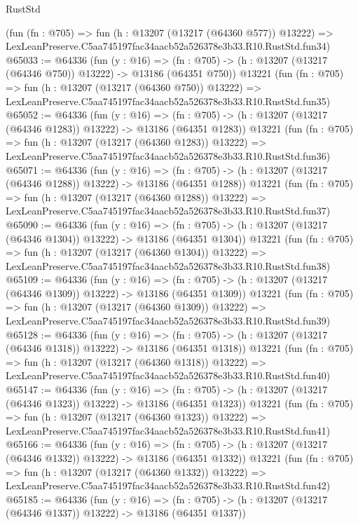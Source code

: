 \begin{lexlean}{RustStd}
\begin{coremodule}
    (fun (fn : @705) =>
    fun (h : @13207 (@13217 (@64360 @577)) @13222) =>
    LexLeanPreserve.C5aa745197fac34aacb52a526378e3b33.R10.RustStd.fun34)
@65033 := @64336
    (fun (y : @16) =>
    (fn : @705) -> (h : @13207 (@13217 (@64346 @750)) @13222) -> @13186 (@64351 @750))
    @13221
    (fun (fn : @705) =>
    fun (h : @13207 (@13217 (@64360 @750)) @13222) =>
    LexLeanPreserve.C5aa745197fac34aacb52a526378e3b33.R10.RustStd.fun35)
@65052 := @64336
    (fun (y : @16) =>
    (fn : @705) -> (h : @13207 (@13217 (@64346 @1283)) @13222) -> @13186 (@64351 @1283))
    @13221
    (fun (fn : @705) =>
    fun (h : @13207 (@13217 (@64360 @1283)) @13222) =>
    LexLeanPreserve.C5aa745197fac34aacb52a526378e3b33.R10.RustStd.fun36)
@65071 := @64336
    (fun (y : @16) =>
    (fn : @705) -> (h : @13207 (@13217 (@64346 @1288)) @13222) -> @13186 (@64351 @1288))
    @13221
    (fun (fn : @705) =>
    fun (h : @13207 (@13217 (@64360 @1288)) @13222) =>
    LexLeanPreserve.C5aa745197fac34aacb52a526378e3b33.R10.RustStd.fun37)
@65090 := @64336
    (fun (y : @16) =>
    (fn : @705) -> (h : @13207 (@13217 (@64346 @1304)) @13222) -> @13186 (@64351 @1304))
    @13221
    (fun (fn : @705) =>
    fun (h : @13207 (@13217 (@64360 @1304)) @13222) =>
    LexLeanPreserve.C5aa745197fac34aacb52a526378e3b33.R10.RustStd.fun38)
@65109 := @64336
    (fun (y : @16) =>
    (fn : @705) -> (h : @13207 (@13217 (@64346 @1309)) @13222) -> @13186 (@64351 @1309))
    @13221
    (fun (fn : @705) =>
    fun (h : @13207 (@13217 (@64360 @1309)) @13222) =>
    LexLeanPreserve.C5aa745197fac34aacb52a526378e3b33.R10.RustStd.fun39)
@65128 := @64336
    (fun (y : @16) =>
    (fn : @705) -> (h : @13207 (@13217 (@64346 @1318)) @13222) -> @13186 (@64351 @1318))
    @13221
    (fun (fn : @705) =>
    fun (h : @13207 (@13217 (@64360 @1318)) @13222) =>
    LexLeanPreserve.C5aa745197fac34aacb52a526378e3b33.R10.RustStd.fun40)
@65147 := @64336
    (fun (y : @16) =>
    (fn : @705) -> (h : @13207 (@13217 (@64346 @1323)) @13222) -> @13186 (@64351 @1323))
    @13221
    (fun (fn : @705) =>
    fun (h : @13207 (@13217 (@64360 @1323)) @13222) =>
    LexLeanPreserve.C5aa745197fac34aacb52a526378e3b33.R10.RustStd.fun41)
@65166 := @64336
    (fun (y : @16) =>
    (fn : @705) -> (h : @13207 (@13217 (@64346 @1332)) @13222) -> @13186 (@64351 @1332))
    @13221
    (fun (fn : @705) =>
    fun (h : @13207 (@13217 (@64360 @1332)) @13222) =>
    LexLeanPreserve.C5aa745197fac34aacb52a526378e3b33.R10.RustStd.fun42)
@65185 := @64336
    (fun (y : @16) =>
    (fn : @705) -> (h : @13207 (@13217 (@64346 @1337)) @13222) -> @13186 (@64351 @1337))

\end{coremodule}
\end{lexlean}
